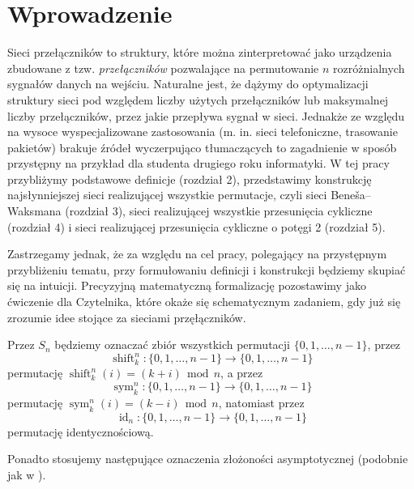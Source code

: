 \documentclass[a4paper]{article}
\renewcommand{\mod}{\, \operatorname{mod} \,}
\newcommand{\shift}[2]{\operatorname{shift}_{#2}^{#1}}
\newcommand{\sym}[2]{\operatorname{sym}_{#2}^{#1}}
\newcommand{\id}[1]{\operatorname{id}_{#1}}
\theoremstyle{definition}
\begin{document}
\section{Wprowadzenie}

Sieci przełączników to struktury, które można zinterpretować jako urządzenia zbudowane z tzw. \textit{przełączników} pozwalające na permutowanie \(n\) rozróżnialnych sygnałów danych na wejściu. Naturalne jest, że dążymy do optymalizacji struktury sieci pod względem liczby użytych przełączników lub maksymalnej liczby przełączników, przez jakie przepływa sygnał w sieci. Jednakże ze względu na wysoce wyspecjalizowane zastosowania (m. in. sieci telefoniczne, trasowanie pakietów) brakuje źródeł wyczerpująco tłumaczących to zagadnienie w sposób przystępny na przykład dla studenta drugiego roku informatyki. W tej pracy przybliżymy podstawowe definicje (rozdział 2), przedstawimy konstrukcję najsłynniejszej sieci realizującej wszystkie permutacje, czyli sieci Beneša--Waksmana (rozdział 3), sieci realizującej wszystkie przesunięcia cykliczne (rozdział 4) i sieci realizującej przesunięcia cykliczne o potęgi 2 (rozdział 5).  

\vspace{1em}

Zastrzegamy jednak, że za względu na cel pracy, polegający na przystępnym przybliżeniu tematu, przy formułowaniu definicji i konstrukcji będziemy skupiać się na intuicji. Precyzyjną matematyczną formalizację pozostawimy jako ćwiczenie dla Czytelnika, które okaże się schematycznym zadaniem, gdy już się zrozumie idee stojące za sieciami przęłączników. 

\vspace{1em}

Przez \(S_n\) będziemy oznaczać zbiór wszystkich permutacji \(\{0, 1, \ldots, n-1\}\), przez
\[
\shift{n}{k} : \{0, 1, \ldots, n-1\} \to \{0, 1, \ldots, n-1\} 
\]
permutację \(\shift{n}{k}(i) = (k+i) \mod n\), a przez
\[
\sym{n}{k} : \{0, 1, \ldots, n-1\} \to \{0, 1, \ldots, n-1\} 
\]
permutację \(\sym{n}{k}(i) = (k-i) \mod n\), natomiast przez 
\[
\id{n} : \{0, 1, \ldots, n-1\} \to \{0, 1, \ldots, n-1\} 
\]
permutację identycznościową. 

\vspace{1em}

Ponadto stosujemy następujące oznaczenia złożoności asymptotycznej (podobnie jak w \cite{cormen}).
\end{document}
